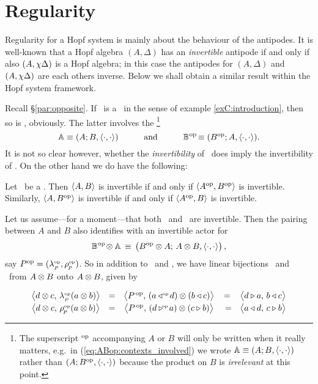 \section{Regularity} \label{par:regularity}



\begin{abs_chp}
Regularity for a Hopf system is mainly about the behaviour of the antipodes.
It is well-known that a Hopf algebra $(A,\Delta)$ has an {\em invertible\/}
antipode if and only if also $(A,\flip\Delta)$ is a Hopf algebra;
in this case the antipodes for $(A,\Delta)$ and $(A,\flip\Delta)$ are each others inverse.
Below we shall obtain a similar result within the Hopf system framework.
\end{abs_chp}



Recall \S \ref{par:opposite}\@.
If \pairAB\ is a \dpa\ in the sense of example \ref{exC:introduction},
then so is \pairABop, obviously. The latter involves the
\contexts\footnote{The superscript $\op$ accompanying $A$ or $B$ will only be
written when it really matters, e.g.\ in (\ref{eq:ABop:contexts_involved}) we wrote
$\Aa \equiv (A; B, \pairing)$ rather than $(A; B\op, \pairing)$
because the product on $B$ is {\em irrelevant\/} at this point.}
\begin{equation} \label{eq:ABop:contexts_involved}
   \Aa \equiv (A; B, \pairing)   \andspace{3em}  \BBop \equiv (B\op; A, \pairing).
\end{equation}
It is not so clear however, whether the {\em invertibility\/} of \pairAB\ does imply
the invertibility of \pairABop\@. On the other hand we do have the following:


\begin{lemma_sec} \label{lem:ABsymmetry}
Let\/ \pairAB\ be a \dpa\@.
Then\/ $\pairAB$ is invertible if and only if\/ $\pair{A\op}{B\op}$ is invertible.
Similarly, $\pair{A}{B\op}$ is invertible if and only if\/
$\pair{A\op}{B}$ is invertible.
\end{lemma_sec}


Let us assume---for a moment---that both \pairAB\ and \pairABop\ are invertible.
Then the pairing between $A$ and $B$ also identifies with an invertible actor for
$$ \BBopAA   \,\equiv\,  \left(\vertM  B\op \tens A; \, A \tens B, \pairing \right), $$
say $P\op = (\lpop,\rpop)$.
So in addition to \lp\ and \rp, we have linear bijections
\lpop\ and \rpop\ from $A \tens B$ onto $A \tens B$, given by

\begin{equation}\label{eq:lamrhoPop:def}
\begin{array}{ccccc}
     \pairM{d \tens c}{\lpop(a \tens b)}
         &=& \pairM{\Pop}{(a \ractop d) \tens (b \ract c)}
         &=& \pairM{d \lact a}{b \ract c}
     \\
     \pairM{d \tens c}{\rpop(a \tens b)}
         &=&        \pairM{\Pop}{(d \lactop a) \tens (c \lact b)}
         &\vertL=&  \pairM{a \ract d}{c \lact b}
\end{array}
\end{equation}

